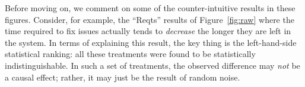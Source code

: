 \documentclass[smallcondensed]{svjour3}
\newcommand{\bi}{\begin{itemize}}%
\newcommand{\ei}{\end{itemize}}
\newcommand{\fig}[1]{Figure~\ref{fig:#1}}
\begin{document}
Before moving on, we comment on some of the counter-intuitive
results in these figures. Consider, for example, the ``Reqts'' results of  \fig{raw} where
the time required to fix issues actually tends to {\em decrease} the longer they are left in the system. In terms of explaining this result, the key thing is the left-hand-side statistical ranking: all these treatments were found to be statistically indistinguishable. In such a set of treatments, the observed
difference may {\em not} be a causal effect; rather, it may just
be the result of  random noise.

 


 
 
\end{document}
